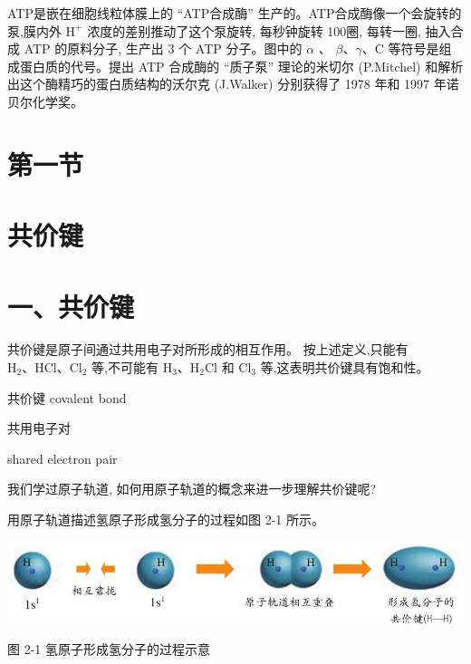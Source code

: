 \documentclass[10pt]{article}
\begin{document}
ATP是嵌在细胞线粒体膜上的 “ATP合成酶” 生产的。ATP合成酶像一个会旋转的泵,膜内外 \({\mathrm{H}}^{ + }\) 浓度的差别推动了这个泵旋转, 每秒钟旋转 100圈, 每转一圈, 抽入合成 ATP 的原料分子, 生产出 3 个 ATP 分子。图中的 \(\alpha\) 、 \(\beta \text{、}\gamma \text{、}\mathrm{C}\) 等符号是组成蛋白质的代号。提出 ATP 合成酶的 “质子泵” 理论的米切尔 (P.Mitchel) 和解析出这个酶精巧的蛋白质结构的沃尔克 (J.Walker) 分别获得了 1978 年和 1997 年诺贝尔化学奖。

\section*{第一节}

\section*{共价键}

\section*{一、共价键}

共价键是原子间通过共用电子对所形成的相互作用。 按上述定义,只能有 \({\mathrm{H}}_{2}\text{、}\mathrm{{HCl}}\text{、}{\mathrm{{Cl}}}_{2}\) 等,不可能有 \({\mathrm{H}}_{3}\text{、}{\mathrm{H}}_{2}\mathrm{{Cl}}\) 和 \({\mathrm{{Cl}}}_{3}\) 等,这表明共价键具有饱和性。

\begin{mdframed}

共价键 covalent bond

共用电子对

shared electron pair

\end{mdframed}

我们学过原子轨道, 如何用原子轨道的概念来进一步理解共价键呢?

用原子轨道描述氢原子形成氢分子的过程如图 2-1 所示。

\begin{center}
\includegraphics[max width=1.0\textwidth]{images/0190e026-5a11-7df7-bd27-54d09026ba7a_37_632847.jpg}
\end{center}

图 2-1 氢原子形成氢分子的过程示意
\end{document}
